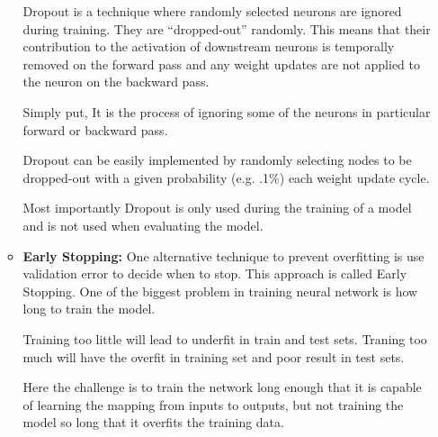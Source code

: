 \begin{itemize}
\begin{itemize}
    Dropout is a technique where randomly selected neurons are ignored during training. They are “dropped-out” randomly. This means that their contribution to the activation of downstream neurons is temporally removed on the forward pass and any weight updates are not applied to the neuron on the backward pass.
    
    Simply put, It is the process of ignoring some of the neurons in particular forward or backward pass.
    
    Dropout can be easily implemented by randomly selecting nodes to be dropped-out with a given probability (e.g. .1\%) each weight update cycle.
    
    Most importantly Dropout is only used during the training of a model and is not used when evaluating the model. \\
    \item \textbf{Early Stopping: } One alternative technique to prevent overfitting is use validation error to decide when to stop. This approach is called Early Stopping.
    One of the biggest problem in training neural network is how long to train the model.
    
    Training too little will lead to underfit in train and test sets. Traning too much will have the overfit in training set and poor result in test sets.
    
    Here the challenge is to train the network long enough that it is capable of learning the mapping from inputs to outputs, but not training the model so long that it overfits the training data.
    

\end{itemize}
\end{itemize}
